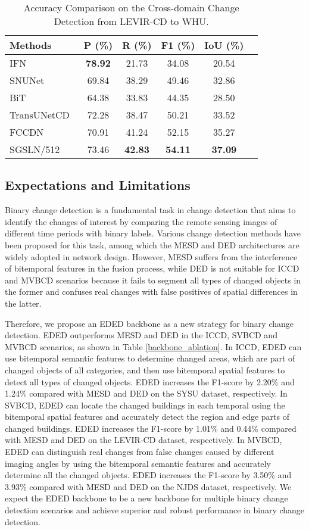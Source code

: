 \documentclass[journal]{IEEEtran}
\begin{document}
\begin{table}[!ht]
\caption{Accuracy Comparison on the Cross-domain Change Detection from LEVIR-CD to WHU.}
\label{transferability}
\centering
\begin{tabular}{lccccc} 
\toprule
Methods & P (\%) & R (\%) & F1 (\%) & IoU (\%) \\
\midrule
IFN~\cite{dsifn} & \textbf{78.92} & 21.73 & 34.08 & 20.54 \\
SNUNet~\cite{snu} & 69.84 & 38.29 & 49.46 & 32.86 \\
BiT~\cite{bit} & 64.38 & 33.83 & 44.35 & 28.50 \\
TransUNetCD~\cite{transunetcd} & 72.28 & 38.47 & 50.21 & 33.52 \\
FCCDN~\cite{fccdn} & 70.91 & 41.24 & 52.15 & 35.27 \\
SGSLN/512 & 73.46 & \textbf{42.83} & \textbf{54.11} & \textbf{37.09} \\
\bottomrule
\end{tabular}
\end{table}


\subsection{Expectations and Limitations}

Binary change detection is a fundamental task in change detection that aims to identify the changes of interest by comparing the remote sensing images of different time periods with binary labels. Various change detection methods have been proposed for this task, among which the MESD and DED architectures are widely adopted in network design. However, MESD suffers from the interference of bitemporal features in the fusion process, while DED is not suitable for ICCD and MVBCD scenarios because it fails to segment all types of changed objects in the former and confuses real changes with false positives of spatial differences in the latter.

Therefore, we propose an EDED backbone as a new strategy for binary change detection. EDED outperforms MESD and DED in the ICCD, SVBCD and MVBCD scenarios, as shown in Table \ref{backbone_ablation}. In ICCD, EDED can use bitemporal semantic features to determine changed areas, which are part of changed objects of all categories, and then use bitemporal spatial features to detect all types of changed objects. EDED increases the F1-score by 2.20\% and 1.24\% compared with MESD and DED on the SYSU dataset, respectively. In SVBCD, EDED can locate the changed buildings in each temporal using the bitemporal spatial features and accurately detect the region and edge parts of changed buildings. EDED increases the F1-score by 1.01\% and 0.44\% compared with MESD and DED on the LEVIR-CD dataset, respectively. In MVBCD, EDED can distinguish real changes from false changes caused by different imaging angles by using the bitemporal semantic features and accurately determine all the changed objects. EDED increases the F1-score by 3.50\% and 3.93\% compared with MESD and DED on the NJDS dataset, respectively. We expect the EDED backbone to be a new backbone for multiple binary change detection scenarios and achieve superior and robust performance in binary change detection.
\end{document}
